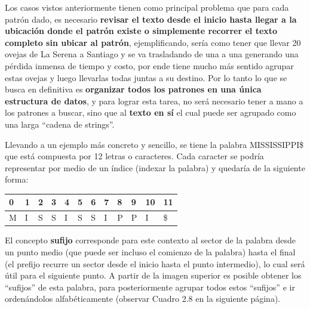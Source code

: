 Los casos vistos anteriormente tienen como principal problema que para cada patrón dado, es necesario \textbf{revisar el texto desde el inicio hasta llegar a la ubicación donde el patrón existe o simplemente recorrer el texto completo sin ubicar al patrón}, ejemplificando, sería como tener que llevar 20 ovejas de La Serena a Santiago y se va trasladando de una a una generando una pérdida inmensa de tiempo y costo, por ende tiene mucho más sentido agrupar estas ovejas y luego llevarlas todas juntas a su destino. Por lo tanto lo que se busca en definitiva es \textbf{organizar todos los patrones en una única estructura de datos}, y para lograr esta tarea, no será necesario tener a mano a los patrones a buscar, sino que al \textbf{texto en sí} el cual puede ser agrupado como una larga ``cadena de strings''.

Llevando a un ejemplo más concreto y sencillo, se tiene la palabra MISSISSIPPI\$ que está compuesta por 12 letras o caracteres. Cada caracter se podría representar por medio de un índice (indexar la palabra) y quedaría de la siguiente forma:

\begin{table}[h]
\centering
\begin{tabular}{llllllllllll}
0                       & 1                      & 2                      & 3                      & 4                      & 5                      & 6                      & 7                      & 8                      & 9                      & 10                     & 11                     \\ \hline
\multicolumn{1}{|l|}{M} & \multicolumn{1}{l|}{I} & \multicolumn{1}{l|}{S} & \multicolumn{1}{l|}{S} & \multicolumn{1}{l|}{I} & \multicolumn{1}{l|}{S} & \multicolumn{1}{l|}{S} & \multicolumn{1}{l|}{I} & \multicolumn{1}{l|}{P} & \multicolumn{1}{l|}{P} & \multicolumn{1}{l|}{I} & \multicolumn{1}{l|}{\$} \\ \hline
\end{tabular}
\end{table}

El concepto \textbf{sufijo} corresponde para este contexto al sector de la palabra desde un punto medio (que puede ser incluso el comienzo de la palabra) hasta el final (el prefijo recurre un sector desde el inicio hasta el punto intermedio), lo cual será útil para el siguiente punto.
A partir de la imagen superior es posible obtener los ``sufijos'' de esta palabra, para posteriormente agrupar todos estos ``sufijos'' e ir ordenándolos alfabéticamente (observar Cuadro 2.8 en la siguiente página).

